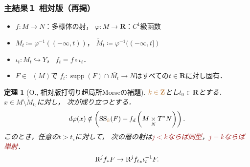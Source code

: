 \documentclass[dvipdfmx,10pt,aspectratio=169,leqno]{beamer}%
\newcommand{\zz}{\mathbf{Z}}
\newcommand{\rr}{\mathbf{R}}
\numberwithin{equation}{subsection}
\newcommand{\supp}{\mathop{\mathrm{supp}}\nolimits}
\newcommand{\Dompb}{\mathop{\mathsf{D}^\mathrm{b}}\nolimits}
\newcommand{\muS}[1][]{\mathop{\mathrm{SS}}\nolimits_{#1}}
\newcommand{\Rder}[1][]{\mathop{\mathrm{R}^{#1}\hspace{-2pt}}\nolimits}
\newcommand{\mdiff}[1][]{{#1}_{d}} %
\newcommand{\pb}[1][]{\mathbin{\mathop{\times}\limits_{#1}}}
\newcommand{\cotb}[1][]{T^{\ast}{#1}}
\theoremstyle{mystyle}
\newtheorem{THM}[AXM]{定理}
\begin{document}
\begin{frame}
  \frametitle{主結果１ 相対版（再掲）}
  \begin{itemize}
    \item \(f\colon M\to N\)：多様体の射，\quad
    \(\varphi\colon M\to \rr\)：\(C^{1}\)級函数
    \item \(M_{t}\coloneqq \varphi^{-1}((-\infty,t))\)，\quad
    \(\widetilde{M}_{t}\coloneqq \varphi^{-1}((-\infty,t])\)
    \item \(\iota_{t}\colon M_{t}\hookrightarrow Y\)，
    \quad\(f_{t}=f\circ \iota_{t}\)．
    \item \(F\in\Dompb(M)\)で
    \(f_{t}\colon \supp(F)\cap \overline{M_t}\to N\)はすべての\(t\in\rr\)に対し固有．
  \end{itemize}
  \begin{THM}[O., 相対版打切り超局所Morseの補題]
    \(\textcolor{brown}{k\in\zz}\)とし\(t_{0}\in\rr\)とする．
    \(x\in M\setminus \widetilde{M}_{t_{0}}\)に対し，
    次が成り立つとする．\[
        d\varphi(x)\notin \left(
          \muS[\textcolor{brown}{k}](F)+ \mdiff[f]\left(
            M\pb[N]\cotb[N]
          \right)
        \right).
      \]
    このとき，任意の\(t>t_{\circ}\)に対して，
    次の層の射は\textcolor{brown}{\(j<k\)ならば同型}，\textcolor{brown}{\(j=k\)ならば単射}．
    \[
      \Rder[j]{f_{\ast}}F
      \to
      \Rder[j]{{f_{t}}_{\ast}}\iota^{-1}_{t}F.
    \]
  \end{THM}
\end{frame}
\end{document}
